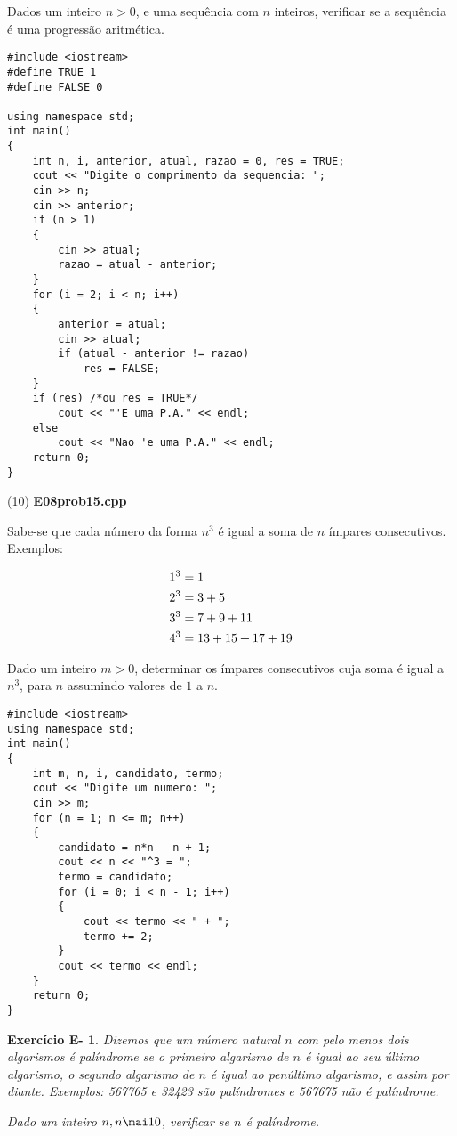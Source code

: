 \documentclass[a4paper]{article}
\newtheorem{eex}{Exerc\'icio E-}
\begin{document}
\begin{sol}
Dados um inteiro $n > 0$, e uma sequência com $n$ inteiros, verificar se a sequência é uma progressão aritmética.

\begin{lstlisting}
#include <iostream>
#define TRUE 1
#define FALSE 0

using namespace std;
int main()
{
    int n, i, anterior, atual, razao = 0, res = TRUE;
    cout << "Digite o comprimento da sequencia: ";
    cin >> n;
    cin >> anterior;
    if (n > 1)
    {
        cin >> atual;
        razao = atual - anterior;
    }
    for (i = 2; i < n; i++)
    {
        anterior = atual;
        cin >> atual;
        if (atual - anterior != razao)
            res = FALSE;
    }
    if (res) /*ou res = TRUE*/
        cout << "'E uma P.A." << endl;
    else
        cout << "Nao 'e uma P.A." << endl;
    return 0;
}
\end{lstlisting}

(10) \textbf{E08prob15.cpp}

Sabe-se que cada número da forma $n^3$ é igual a soma de $n$ ímpares consecutivos. Exemplos:

\[
\begin{gathered}
  1^3 = 1 \hfill \\
  2^3 = 3 + 5 \hfill \\ 
  3^3 = 7 + 9 + 11 \hfill \\ 
  4^3 = 13 + 15 + 17 + 19 \hfill \\ 
\end{gathered} 
\]

Dado um inteiro $m > 0$, determinar os ímpares consecutivos cuja soma é igual a $n^3$, para $n$ assumindo valores de $1$ a $n$.

\begin{lstlisting}
#include <iostream>
using namespace std;
int main()
{
    int m, n, i, candidato, termo;
    cout << "Digite um numero: ";
    cin >> m;
    for (n = 1; n <= m; n++)
    {
        candidato = n*n - n + 1;
        cout << n << "^3 = ";
        termo = candidato;
        for (i = 0; i < n - 1; i++)
        {
            cout << termo << " + ";
            termo += 2;
        }
        cout << termo << endl;
    }
    return 0;
}
\end{lstlisting}

\end{sol}

\newpage 

\begin{eex}
Dizemos que um número natural $n$ com pelo menos dois algarismos é \emph{palíndrome} se o primeiro algarismo de $n$ é igual ao seu último algarismo, o segundo algarismo de $n$ é igual ao penúltimo algarismo, e assim por diante. Exemplos: 567765 e 32423 são palíndromes e 567675 não é palíndrome. 

Dado um inteiro $n, n \mai 10$, verificar se $n$ é palíndrome.
\end{eex}
\end{document}
